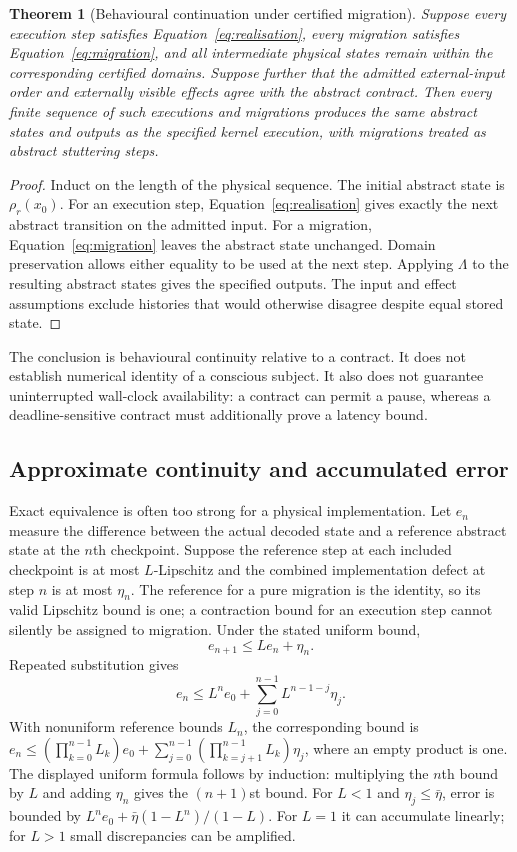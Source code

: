 \documentclass[11pt,a4paper]{article}
\newtheorem{theorem}{Theorem}[section]
\theoremstyle{definition}
\theoremstyle{remark}
\begin{document}
\begin{theorem}[Behavioural continuation under certified migration]\label{thm:continuation}
Suppose every execution step satisfies Equation~\eqref{eq:realisation}, every migration satisfies Equation~\eqref{eq:migration}, and all intermediate physical states remain within the corresponding certified domains. Suppose further that the admitted external-input order and externally visible effects agree with the abstract contract. Then every finite sequence of such executions and migrations produces the same abstract states and outputs as the specified kernel execution, with migrations treated as abstract stuttering steps.
\end{theorem}
\begin{proof}
Induct on the length of the physical sequence. The initial abstract state is $\rho_r(x_0)$. For an execution step, Equation~\eqref{eq:realisation} gives exactly the next abstract transition on the admitted input. For a migration, Equation~\eqref{eq:migration} leaves the abstract state unchanged. Domain preservation allows either equality to be used at the next step. Applying $\Lambda$ to the resulting abstract states gives the specified outputs. The input and effect assumptions exclude histories that would otherwise disagree despite equal stored state.
\end{proof}
The conclusion is behavioural continuity relative to a contract. It does not establish numerical identity of a conscious subject. It also does not guarantee uninterrupted wall-clock availability: a contract can permit a pause, whereas a deadline-sensitive contract must additionally prove a latency bound.

\subsection{Approximate continuity and accumulated error}
Exact equivalence is often too strong for a physical implementation. Let $e_n$ measure the difference between the actual decoded state and a reference abstract state at the $n$th checkpoint. Suppose the reference step at each included checkpoint is at most $L$-Lipschitz and the combined implementation defect at step $n$ is at most $\eta_n$. The reference for a pure migration is the identity, so its valid Lipschitz bound is one; a contraction bound for an execution step cannot silently be assigned to migration. Under the stated uniform bound,
\begin{equation}\label{eq:errorrec}
 e_{n+1}\leq Le_n+\eta_n.
\end{equation}
Repeated substitution gives
\begin{equation}\label{eq:errorbound}
 e_n\leq L^ne_0+\sum_{j=0}^{n-1}L^{n-1-j}\eta_j.
\end{equation}
With nonuniform reference bounds $L_n$, the corresponding bound is $e_n\leq(\prod_{k=0}^{n-1}L_k)e_0+\sum_{j=0}^{n-1}(\prod_{k=j+1}^{n-1}L_k)\eta_j$, where an empty product is one. The displayed uniform formula follows by induction: multiplying the $n$th bound by $L$ and adding $\eta_n$ gives the $(n+1)$st bound. For $L<1$ and $\eta_j\leq\bar\eta$, error is bounded by $L^ne_0+\bar\eta(1-L^n)/(1-L)$. For $L=1$ it can accumulate linearly; for $L>1$ small discrepancies can be amplified.
\end{document}
